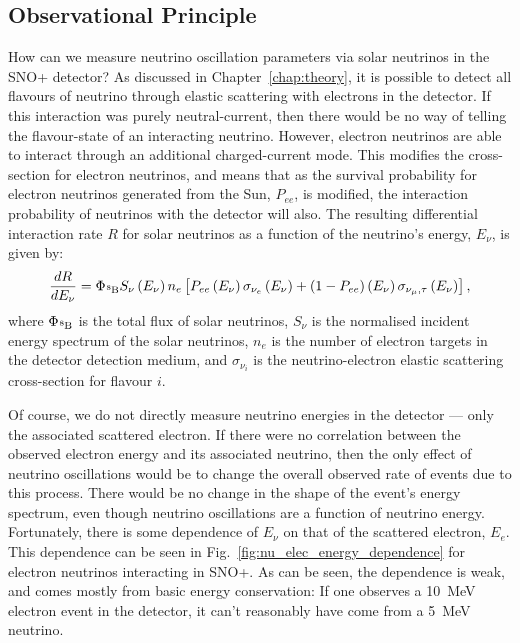 \subsection{Observational Principle}\label{sec:solar_obs_principle}
How can we measure neutrino oscillation parameters via solar neutrinos in the SNO+ detector? As discussed in Chapter~\ref{chap:theory}, %
it is possible to detect all flavours of neutrino through elastic scattering with electrons in the detector. If this interaction was purely neutral-current, then there would be no way of telling the flavour-state of an interacting neutrino. However, electron neutrinos are able to interact through an additional charged-current mode. This modifies the cross-section for electron neutrinos, and means that as the survival probability for electron neutrinos generated from the Sun, $P_{ee}$, is modified, the interaction probability of neutrinos with the detector will also. The resulting differential interaction rate $R$ for solar neutrinos as a function of the neutrino's energy, $E_{\nu}$, is given by:
\begin{equation}\label{eq:solar_rate}
    \frac{dR}{dE_{\nu}} = 
        \Phi_{\beight{}}S_{\nu}\left(E_{\nu}\right)n_{e}
            \left[
                P_{ee}\left(E_{\nu}\right)\sigma_{\nu_e}\left(E_{\nu}\right) +
                \left(1-P_{ee}\right)\left(E_{\nu}\right)\sigma_{\nu_\mu,\tau}\left(E_{\nu}\right)
            \right],
\end{equation}
where $\Phi_{\beight{}}$ is the total flux of \beight{} solar neutrinos, $S_{\nu}$ is the normalised incident energy spectrum of the solar neutrinos, $n_{e}$ is the number of electron targets in the detector detection medium, and $\sigma_{\nu_{i}}$ is the neutrino-electron elastic scattering cross-section for flavour $i$.

Of course, we do not directly measure neutrino energies in the detector --- only the associated scattered electron. If there were no correlation between the observed electron energy and its associated neutrino, then the only effect of neutrino oscillations would be to change the overall observed rate of events due to this process. There would be no change in the shape of the event's energy spectrum, even though neutrino oscillations are a function of neutrino energy. Fortunately, there is some dependence of $E_{\nu}$ on that of the scattered electron, $E_{e}$. This dependence can be seen in Fig.~\ref{fig:nu_elec_energy_dependence} for \beight{} electron neutrinos interacting in SNO+. %
As can be seen, the dependence is weak, and comes mostly from basic energy conservation: If one observes a \SI{10}{\MeV} electron event in the detector, it can't reasonably have come from a \SI{5}{\MeV} neutrino.

